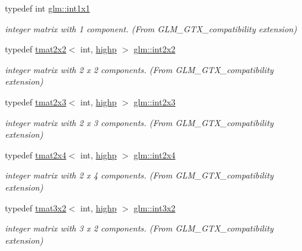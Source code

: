 \begin{DoxyCompactItemize}
typedef int \mbox{\hyperlink{group__gtx__compatibility_ga09016a637a3cd093c22e6188080ac750}{glm\+::int1x1}}
\begin{DoxyCompactList}\small\item\em integer matrix with 1 component. (From G\+L\+M\+\_\+\+G\+T\+X\+\_\+compatibility extension) \end{DoxyCompactList}\item 
typedef \mbox{\hyperlink{structglm_1_1tmat2x2}{tmat2x2}}$<$ int, \mbox{\hyperlink{namespaceglm_a0f04f086094c747d227af4425893f545ac6f7eab42eacbb10d59a58e95e362074}{highp}} $>$ \mbox{\hyperlink{group__gtx__compatibility_ga5f407f808d8fa5b771ea7417cedc4868}{glm\+::int2x2}}
\begin{DoxyCompactList}\small\item\em integer matrix with 2 x 2 components. (From G\+L\+M\+\_\+\+G\+T\+X\+\_\+compatibility extension) \end{DoxyCompactList}\item 
typedef \mbox{\hyperlink{structglm_1_1tmat2x3}{tmat2x3}}$<$ int, \mbox{\hyperlink{namespaceglm_a0f04f086094c747d227af4425893f545ac6f7eab42eacbb10d59a58e95e362074}{highp}} $>$ \mbox{\hyperlink{group__gtx__compatibility_ga37b2b18255fa5ff7fa23d8b1d34b8034}{glm\+::int2x3}}
\begin{DoxyCompactList}\small\item\em integer matrix with 2 x 3 components. (From G\+L\+M\+\_\+\+G\+T\+X\+\_\+compatibility extension) \end{DoxyCompactList}\item 
typedef \mbox{\hyperlink{structglm_1_1tmat2x4}{tmat2x4}}$<$ int, \mbox{\hyperlink{namespaceglm_a0f04f086094c747d227af4425893f545ac6f7eab42eacbb10d59a58e95e362074}{highp}} $>$ \mbox{\hyperlink{group__gtx__compatibility_gaa402ce479f756c0805d25fede99251e3}{glm\+::int2x4}}
\begin{DoxyCompactList}\small\item\em integer matrix with 2 x 4 components. (From G\+L\+M\+\_\+\+G\+T\+X\+\_\+compatibility extension) \end{DoxyCompactList}\item 
typedef \mbox{\hyperlink{structglm_1_1tmat3x2}{tmat3x2}}$<$ int, \mbox{\hyperlink{namespaceglm_a0f04f086094c747d227af4425893f545ac6f7eab42eacbb10d59a58e95e362074}{highp}} $>$ \mbox{\hyperlink{group__gtx__compatibility_gac99c78a227d95384611146a64c4d3ce8}{glm\+::int3x2}}
\begin{DoxyCompactList}\small\item\em integer matrix with 3 x 2 components. (From G\+L\+M\+\_\+\+G\+T\+X\+\_\+compatibility extension) \end{DoxyCompactList}\item 

\end{DoxyCompactItemize}
